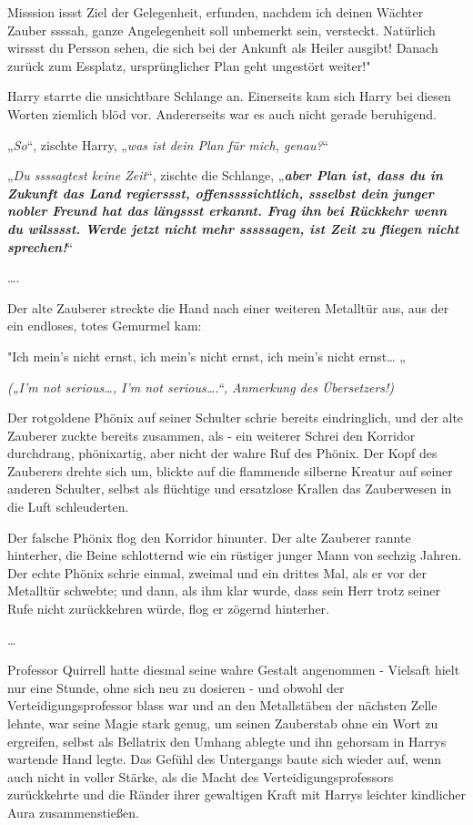 {{{Misssion issst Ziel der Gelegenheit, erfunden, nachdem ich deinen Wächter Zauber ssssah, ganze Angelegenheit soll unbemerkt sein, versteckt. Natürlich wirssst du Persson sehen, die sich bei der Ankunft als Heiler ausgibt! Danach zurück zum Essplatz, ursprünglicher Plan geht ungestört weiter!}}"

Harry starrte die unsichtbare Schlange an. Einerseits kam sich Harry bei diesen Worten ziemlich blöd vor. Andererseits war es auch nicht gerade beruhigend.

„\emph{So}“, zischte Harry, „\emph{was ist dein Plan für mich, genau?}“

„\emph{Du ssssagtest keine Zeit}“, zischte die Schlange, „\textbf{\emph{aber Plan ist, dass du in Zukunft das Land regierssst, offenssssichtlich, ssselbst dein junger nobler Freund hat das längssst erkannt. Frag ihn bei Rückkehr wenn du wilsssst. Werde jetzt nicht mehr sssssagen, ist Zeit zu fliegen nicht sprechen!}}“

….

Der alte Zauberer streckte die Hand nach einer weiteren Metalltür aus, aus der ein endloses, totes Gemurmel kam:

"Ich mein's nicht ernst, ich mein's nicht ernst, ich mein's nicht ernst… „

\emph{(„I'm not serious…, I'm not serious….“, Anmerkung des Übersetzers!)}

Der rotgoldene Phönix auf seiner Schulter schrie bereits eindringlich, und der alte Zauberer zuckte bereits zusammen, als - ein weiterer Schrei den Korridor durchdrang, phönixartig, aber nicht der wahre Ruf des Phönix. Der Kopf des Zauberers drehte sich um, blickte auf die flammende silberne Kreatur auf seiner anderen Schulter, selbst als flüchtige und ersatzlose Krallen das Zauberwesen in die Luft schleuderten.

Der falsche Phönix flog den Korridor hinunter. Der alte Zauberer rannte hinterher, die Beine schlotternd wie ein rüstiger junger Mann von sechzig Jahren. Der echte Phönix schrie einmal, zweimal und ein drittes Mal, als er vor der Metalltür schwebte; und dann, als ihm klar wurde, dass sein Herr trotz seiner Rufe nicht zurückkehren würde, flog er zögernd hinterher.

…

Professor Quirrell hatte diesmal seine wahre Gestalt angenommen - Vielsaft hielt nur eine Stunde, ohne sich neu zu dosieren - und obwohl der Verteidigungsprofessor blass war und an den Metallstäben der nächsten Zelle lehnte, war seine Magie stark genug, um seinen Zauberstab ohne ein Wort zu ergreifen, selbst als Bellatrix den Umhang ablegte und ihn gehorsam in Harrys wartende Hand legte. Das Gefühl des Untergangs baute sich wieder auf, wenn auch nicht in voller Stärke, als die Macht des Verteidigungsprofessors zurückkehrte und die Ränder ihrer gewaltigen Kraft mit Harrys leichter kindlicher Aura zusammenstießen.

}
